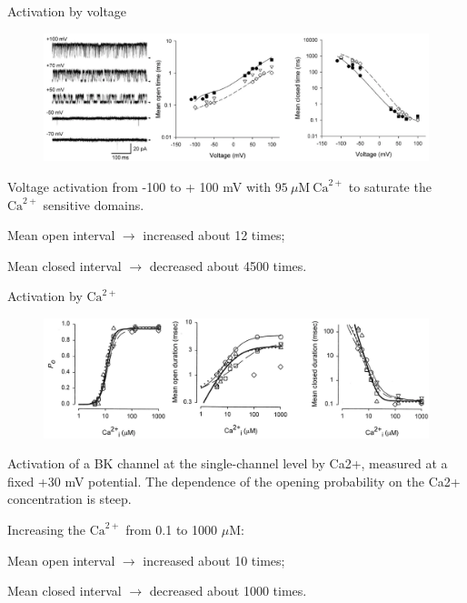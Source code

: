 \documentclass{beamer}
\newcommand{\ca}{\text{Ca}^{2+}}
\begin{document}
\begin{frame}{Activation by voltage}
\begin{figure}
\centering
\includegraphics[width=\textwidth]{Voltage_Opening.png}
\end{figure}
Voltage activation from -100 to + 100 mV with $95\ \mu\text{M}\ \ca$ to saturate the $\ca$ sensitive domains.

Mean open interval $\rightarrow$ increased about 12 times;

\vspace{-8pt}
Mean closed interval $\rightarrow$ decreased about 4500 times.
\vfill
\end{frame}

\begin{frame}{Activation by $\ca$}
\begin{figure}
\centering
\includegraphics[width=.9\textwidth]{Ca_activation_1.png}
\end{figure}
\vspace{-5pt}
Activation of a BK channel at the single-channel level by Ca2+, measured at a fixed +30 mV potential.
The dependence of the opening probability on the Ca2+ concentration is steep.

Increasing the $\ca$ from 0.1 to 1000 $\mu\text{M}:$

Mean open interval $\rightarrow$ increased about 10 times;

\vspace{-5pt}
Mean closed interval $\rightarrow$ decreased about 1000 times.
\vfill
\end{frame}
\end{document}
